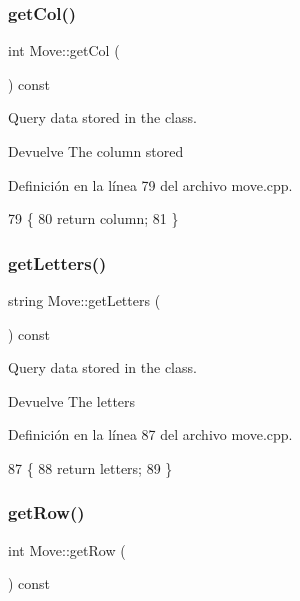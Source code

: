 \subsubsection{\texorpdfstring{get\+Col()}{getCol()}}
{\footnotesize\ttfamily int Move\+::get\+Col (\begin{DoxyParamCaption}{ }\end{DoxyParamCaption}) const}



Query data stored in the class. 

\begin{DoxyReturn}{Devuelve}
The column stored 
\end{DoxyReturn}


Definición en la línea 79 del archivo move.\+cpp.


\begin{DoxyCode}
79                       \{
80     \textcolor{keywordflow}{return} column;
81 \}
\end{DoxyCode}
\mbox{\label{classMove_a4b9b78f296ca21b7c474d637ff51d9ae}} 
\subsubsection{\texorpdfstring{get\+Letters()}{getLetters()}}
{\footnotesize\ttfamily string Move\+::get\+Letters (\begin{DoxyParamCaption}{ }\end{DoxyParamCaption}) const}



Query data stored in the class. 

\begin{DoxyReturn}{Devuelve}
The letters 
\end{DoxyReturn}


Definición en la línea 87 del archivo move.\+cpp.


\begin{DoxyCode}
87                              \{
88     \textcolor{keywordflow}{return} letters;
89 \}
\end{DoxyCode}
\mbox{\label{classMove_aa8fcb5e4f786cbf46452ae6cc8b2854a}} 
\subsubsection{\texorpdfstring{get\+Row()}{getRow()}}
{\footnotesize\ttfamily int Move\+::get\+Row (\begin{DoxyParamCaption}{ }\end{DoxyParamCaption}) const}



